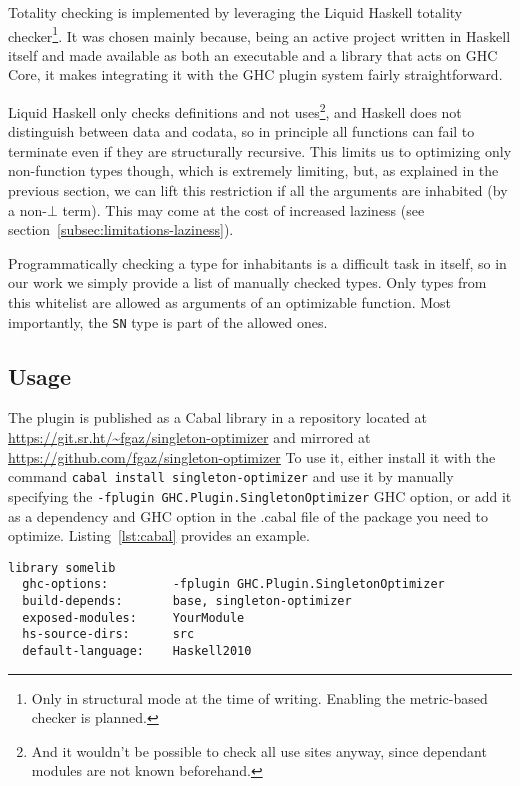 Totality checking is implemented by leveraging the Liquid Haskell\cite{refinement-types-for-haskell} totality checker\footnote{Only in structural mode at the time of writing. Enabling the metric-based checker is planned.}.
It was chosen mainly because, being an active project written in Haskell itself and made available as both an executable and a library that acts on GHC Core, it makes integrating it with the GHC plugin system fairly straightforward.

Liquid Haskell only checks definitions and not uses\footnote{And it wouldn't be possible to check all use sites anyway, since dependant modules are not known beforehand.}, and Haskell does not distinguish between data and codata, so in principle all functions can fail to terminate even if they are structurally recursive.
This limits us to optimizing only non-function types though, which is extremely limiting, but, as explained in the previous section, we can lift this restriction if all the arguments are inhabited (by a non-$\bot$ term).
This may come at the cost of increased laziness (see section~\ref{subsec:limitations-laziness}).

Programmatically checking a type for inhabitants is a difficult task in itself, so in our work we simply provide a list of manually checked types.
Only types from this whitelist are allowed as arguments of an optimizable function.
Most importantly, the \texttt{SN} type is part of the allowed ones.

\subsection{Usage}
\label{subsec:usage}

The plugin is published as a Cabal library in a repository located at \url{https://git.sr.ht/~fgaz/singleton-optimizer} and mirrored at \url{https://github.com/fgaz/singleton-optimizer}
To use it, either install it with the command \texttt{cabal install singleton-optimizer} and use it by manually specifying the \texttt{-fplugin GHC.Plugin.SingletonOptimizer} GHC option, or add it as a dependency and GHC option in the .cabal file of the package you need to optimize.
Listing~\ref{lst:cabal} provides an example.

\begin{lstlisting}[label=lst:cabal, caption=Example .cabal stanza]
library somelib
  ghc-options:         -fplugin GHC.Plugin.SingletonOptimizer
  build-depends:       base, singleton-optimizer
  exposed-modules:     YourModule
  hs-source-dirs:      src
  default-language:    Haskell2010
\end{lstlisting}


